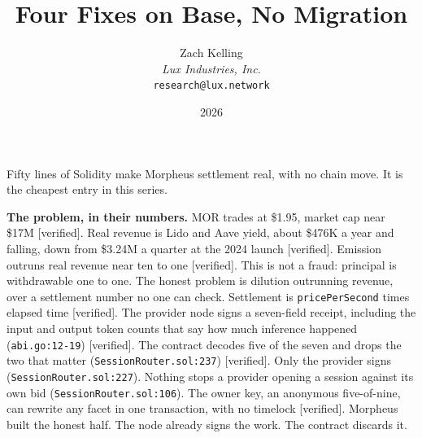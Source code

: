 \documentclass[11pt,a4paper]{article}
\title{Four Fixes on Base, No Migration}
\author{Zach Kelling\\\textit{Lux Industries, Inc.}\\\texttt{research@lux.network}}
\date{2026}
\newcommand{\code}[1]{\texttt{\small #1}}
\begin{document}
\luxcoverpage
\sloppy

\par
\vspace{0.8ex}
\par
\vspace{0.7ex}
\noindent{\color{rule}\rule{\linewidth}{1.1pt}}\par
\vspace{1.0ex}

\noindent
Fifty lines of Solidity make Morpheus settlement real, with no chain move. It is the
cheapest entry in this series.

\vspace{0.6ex}
\noindent\textbf{The problem, in their numbers.}
MOR trades at \$1.95, market cap near \$17M [verified]. Real revenue is Lido and Aave yield,
about \$476K a year and falling, down from \$3.24M a quarter at the 2024 launch [verified].
Emission outruns real revenue near ten to one [verified]. This is not a fraud: principal is
withdrawable one to one. The honest problem is dilution outrunning revenue, over a settlement
number no one can check. Settlement is \code{pricePerSecond} times elapsed time [verified]. The
provider node signs a seven-field receipt, including the input and output token counts that say
how much inference happened (\code{abi.go:12-19}) [verified]. The contract decodes five of the
seven and drops the two that matter (\code{SessionRouter.sol:237}) [verified]. Only the provider
signs (\code{SessionRouter.sol:227}). Nothing stops a provider opening a session against its own
bid (\code{SessionRouter.sol:106}). The owner key, an anonymous five-of-nine, can rewrite any
facet in one transaction, with no timelock [verified]. Morpheus built the honest half. The node
already signs the work. The contract discards it.
\end{document}
